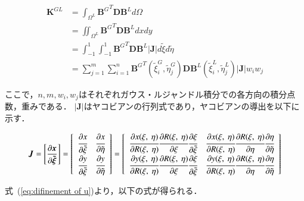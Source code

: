 \begin{align}
  \boldsymbol{K}^{GL}&=\int_{\Omega^L} {\boldsymbol{B}^G}^T\boldsymbol{D}\boldsymbol{B}^Ld\Omega \nonumber \\
  &=\iint_{\Omega^L} {\boldsymbol{B}^G}^T\boldsymbol{D}\boldsymbol{B}^Ldx dy \nonumber \\
  &=\int_{-1}^1\int_{-1}^1 {\boldsymbol{B}^G}^T\boldsymbol{D}\boldsymbol{B}^L|\boldsymbol{J}|d\tilde{\xi} d\tilde{\eta} \nonumber \\
  &=\sum^m_{j=1}\sum^n_{i=1} {\boldsymbol{B}^G}^T\left(\tilde{\xi}_i^G,\tilde{\eta}_j^G\right)\boldsymbol{D}\boldsymbol{B}^L\left(\tilde{\xi}_i^L,\tilde{\eta}_j^L\right)|\boldsymbol{J}|w_iw_j
\end{align}

\noindent
ここで，$n,m,w_i,w_j$はそれぞれガウス・ルジャンドル積分での各方向の積分点数，重みである．
$|\boldsymbol{J}|$はヤコビアンの行列式であり，ヤコビアンの導出を以下に示す．

\begin{equation}
  \boldsymbol{J} = \left[
    \frac{\partial \boldsymbol{x}}{\partial \boldsymbol{\tilde{\xi}}}
  \right] =
  \left[
    \begin{array}{cc}
      \cfrac{\partial x}{\partial \tilde{\xi}} & \cfrac{\partial x}{\partial \tilde{\eta}}\\
      \cfrac{\partial y}{\partial \tilde{\xi}} & \cfrac{\partial y}{\partial \tilde{\eta}}
    \end{array}
  \right] =
  \left[
    \begin{array}{cc}
      \cfrac{\partial x(\xi,\ \eta)}{\partial R(\xi,\ \eta)} \cfrac{\partial R(\xi,\ \eta)}{\partial \xi} \cfrac{\partial \xi}{\partial \tilde{\xi}} & \cfrac{\partial x(\xi,\ \eta)}{\partial R(\xi,\ \eta)} \cfrac{\partial R(\xi,\ \eta)}{\partial \eta} \cfrac{\partial \eta}{\partial \tilde{\eta}}\\
      \cfrac{\partial y(\xi,\ \eta)}{\partial R(\xi,\ \eta)} \cfrac{\partial R(\xi,\ \eta)}{\partial \xi} \cfrac{\partial \xi}{\partial \tilde{\xi}} & \cfrac{\partial y(\xi,\ \eta)}{\partial R(\xi,\ \eta)} \cfrac{\partial R(\xi,\ \eta)}{\partial \eta} \cfrac{\partial \eta}{\partial \tilde{\eta}}
    \end{array}
  \right]
\end{equation}

\noindent
式~(\ref{eq:difinement of u})より，以下の式が得られる．

